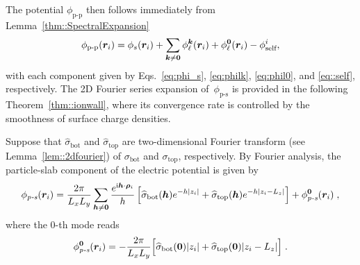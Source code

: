 The potential $\phi_{\text{p-p}}$ then follows immediately from Lemma~\ref{thm::SpectralExpansion}
\begin{equation}\label{eq::phiion-ion}
	\phi_{\text{p-p}}(\bm{r}_{i})=\phi_{s}(\bm{r}_{i}) + \sum_{\bm{k}\neq\bm{0}} \phi_{\ell}^{\boldsymbol{k}}(\bm{r}_{i}) + \phi_{\ell}^{\boldsymbol{0}}(\bm{r}_{i}) - \phi_{\text{self}}^{i},
\end{equation}
with each component given by Eqs.~\eqref{eq:phi_s}, \eqref{eq:philk}, \eqref{eq:phil0}, and \eqref{eq::self}, respectively. 
The 2D Fourier series expansion of~$\phi_{\text{p-s}}$ is provided in the following Theorem~\ref{thm::ionwall}, where its convergence rate is controlled by the smoothness of surface charge densities.
\begin{thm}\label{thm::ionwall}
	Suppose that $\widehat{\sigma}_{\mathrm{bot}}$ and $\widehat{\sigma}_{\mathrm{top}}$ are two-dimensional Fourier transform (see Lemma~\ref{lem::2dfourier}) of $\sigma_{\mathrm{bot}}$ and $\sigma_{\mathrm{top}}$, respectively. By Fourier analysis, the particle-slab component of the electric potential is given by
	\begin{equation}\label{eq::phiionwall}
		\phi_{\emph{p-s}}(\bm{r}_{i}) = \frac{2\pi}{L_xL_y}\sum_{\bm{h}\neq \bm{0}}\frac{e^{\mathrm{i} \bm{h}\cdot\bm{\rho}_{i}}}{h}\left[\widehat{\sigma}_{\mathrm{bot}}(\bm{h})e^{-h|z_{i}|}+\widehat{\sigma}_{\mathrm{top}}(\bm{h})e^{-h|z_{i}-L_z|}\right]+\phi_{\emph{p-s}}^{\bm{0}}(\bm{r}_{i})\;,
	\end{equation}
	where the 0-th mode reads
	\begin{equation}\label{eq::phionwallzero}
		\phi_{\emph{p-s}}^{\bm{0}}(\bm{r}_{i})=-\frac{2\pi}{L_xL_y}\Big[\widehat{\sigma}_{\mathrm{bot}}(\bm{0})|z_{i}|+\widehat{\sigma}_{\mathrm{top}}(\bm{0})|z_{i}-L_z|\Big]\;.
	\end{equation}
\end{thm}
